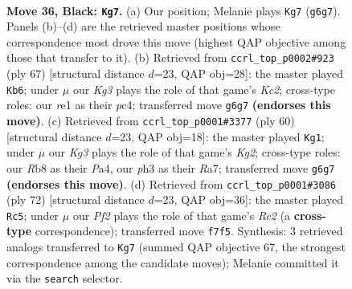 \documentclass[11pt]{article}
\begin{document}
\clearpage

\begin{figure}[p]\centering
\begin{subfigure}{0.46\textwidth}\centering
\resizebox{\linewidth}{!}{%
\newchessgame
\chessboard[
  setfen={1r6/1p3p2/p3p1k1/8/P3P3/5P1P/1R3K1P/4R3 b - - 2 36},
  showmover=false,
  pgfstyle=straightmove, color=movearrow, markmove={g6-g7}
]}
\caption{}
\end{subfigure}\hfill
\begin{subfigure}{0.46\textwidth}\centering
\resizebox{\linewidth}{!}{%
\newchessgame
\chessboard[
  setfen={r7/2k1pp2/6p1/p2K3p/2P4P/4P3/R4PP1/8 b - - 1 34},
  showmover=false,
  pgfstyle=straightmove, color=movearrow, markmove={c7-b6}
]}
\caption{}
\end{subfigure}
\\[4pt]
\begin{subfigure}{0.46\textwidth}\centering
\resizebox{\linewidth}{!}{%
\newchessgame
\chessboard[
  setfen={8/Rp3p2/4pk1p/8/P4P2/4P3/1r3PK1/8 w - - 1 31},
  showmover=false,
  pgfstyle=straightmove, color=movearrow, markmove={g2-g1}
]}
\caption{}
\end{subfigure}\hfill
\begin{subfigure}{0.46\textwidth}\centering
\resizebox{\linewidth}{!}{%
\newchessgame
\chessboard[
  setfen={8/5k2/p3r1p1/5p2/3P1P2/1r2P2P/2R2K2/4R3 w - - 0 37},
  showmover=false,
  pgfstyle=straightmove, color=movearrow, markmove={c2-c5}
]}
\caption{}
\end{subfigure}
\caption{\textbf{Move 36, Black: \texttt{Kg7}.} (a) Our position; Melanie plays \texttt{Kg7} (\texttt{g6g7}). Panels (b)--(d) are the retrieved master positions whose correspondence most drove this move (highest QAP objective among those that transfer to it). (b) Retrieved from \texttt{ccrl\_top\_p0002\#923} (ply 67) [structural distance $d$=23, QAP obj=28]: the master played \texttt{Kb6}; under $\mu$ our \emph{Kg3} plays the role of that game's \emph{Kc2}; cross-type roles: our \emph{r}e1 as their \emph{p}c4; transferred move \texttt{g6g7} \textbf{(endorses this move)}. (c) Retrieved from \texttt{ccrl\_top\_p0001\#3377} (ply 60) [structural distance $d$=23, QAP obj=18]: the master played \texttt{Kg1}; under $\mu$ our \emph{Kg3} plays the role of that game's \emph{Kg2}; cross-type roles: our \emph{R}b8 as their \emph{P}a4, our \emph{p}h3 as their \emph{R}a7; transferred move \texttt{g6g7} \textbf{(endorses this move)}. (d) Retrieved from \texttt{ccrl\_top\_p0001\#3086} (ply 72) [structural distance $d$=23, QAP obj=36]: the master played \texttt{Rc5}; under $\mu$ our \emph{Pf2} plays the role of that game's \emph{Rc2} (a \textbf{cross-type} correspondence); transferred move \texttt{f7f5}. Synthesis: 3 retrieved analogs transferred to \texttt{Kg7} (summed QAP objective 67, the strongest correspondence among the candidate moves); Melanie committed it via the \texttt{search} selector.}
\label{fig:thought-m71}
\end{figure}
\end{document}
